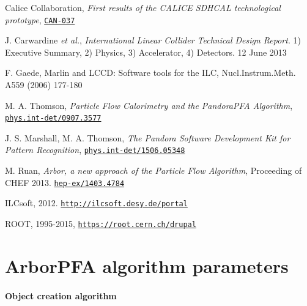 \documentclass[cits]{JINST}
\begin{document}
\newpage
\begin{thebibliography}{6}
\renewcommand{\hepex}[1]{\href{http://www.arxiv.org/abs/#1}{\tt hep-ex/#1}}
\renewcommand{\physics}[1]{\href{http://www.arxiv.org/abs/#1}{\tt phys.int-det/#1}}
\newcommand\nim[4]{\href{http://dx.doi.org/10.1016/#4}
  {\emph{Nucl.\ Instrum.\ Meth.} {\bf #1} (#2) #3}}
\newcommand\can[1]{\href{https://twiki.cern.ch/twiki/pub/CALICE/CaliceAnalysisNotes/CAN-#1.pdf}{\tt CAN-#1}}


Calice Collaboration, \emph{First results of the CALICE SDHCAL technological prototype}, \can{037}

J. Carwardine {\it et al.},  \emph{International Linear Collider Technical Design Report}. 1) Executive Summary, 2) Physics, 3) Accelerator, 4) Detectors. 12 June 2013

F. Gaede, Marlin and LCCD: Software tools for the ILC, Nucl.Instrum.Meth. A559 (2006) 177-180

M. A. Thomson, \emph{Particle Flow Calorimetry and the PandoraPFA Algorithm}, \physics{0907.3577}

J. S. Marshall, M. A. Thomson, \emph{The Pandora Software Development Kit for Pattern Recognition}, \physics{1506.05348}


M. Ruan, \emph{Arbor, a new approach of the Particle Flow Algorithm}, Proceeding of CHEF 2013. \hepex{1403.4784}


ILCsoft, 2012. \href{http://ilcsoft.desy.de/portal}{\tt http://ilcsoft.desy.de/portal}


ROOT, 1995-2015, \href{https://root.cern.ch/drupal}{\tt https://root.cern.ch/drupal}

\newpage

\end{thebibliography}


\clearpage
\appendix

\section{ArborPFA algorithm parameters}
\label{ARBOR_ALGORITHM_PARAMETERS}

\paragraph{Object creation algorithm} ~
\end{document}
